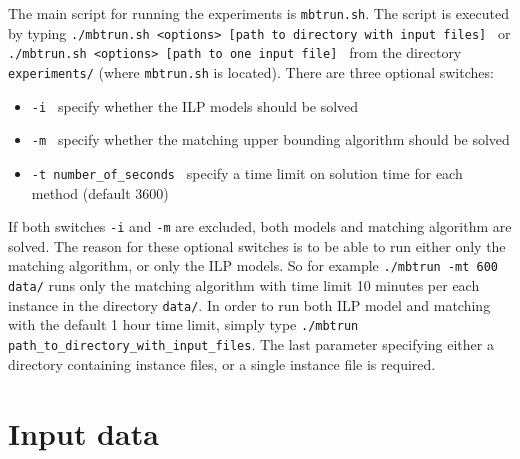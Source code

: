 \documentclass[12pt]{article}
\begin{document}
The main script for running the experiments is \texttt{mbtrun.sh}.
The script is executed by typing \newline\newline
\texttt{./mbtrun.sh <options> [path to directory with input files] }\newline\newline
or\newline\newline 
\texttt{./mbtrun.sh <options> [path to one input file] }\newline\newline
from the directory \texttt{experiments/} (where \texttt{mbtrun.sh} is located).
There are three optional switches:
\begin{itemize}
	\item[] \texttt{-i }  specify whether the ILP models should be solved 
	\item[] \texttt{-m }  specify whether the matching upper bounding algorithm should be solved 
	\item[] \texttt{-t number\_of\_seconds }  specify a time limit on solution time for each method (default 3600)
\end{itemize}
If both switches \texttt{-i} and \texttt{-m} are excluded, both models and matching algorithm are solved.
The reason for these optional switches is to be able to run either only the matching algorithm, or only the ILP models.
So for example \newline\newline
\texttt{./mbtrun -mt 600 data/} 
\newline\newline
runs only the matching algorithm with time limit 10 minutes per each instance in the directory \texttt{data/}.
In order to run both ILP model and matching with the default 1 hour time limit, simply type \newline\newline
\texttt{./mbtrun path\_to\_directory\_with\_input\_files}.
\newline\newline
The last parameter specifying either a directory containing instance files, or a single instance file is required.

\section{Input data}
\end{document}

